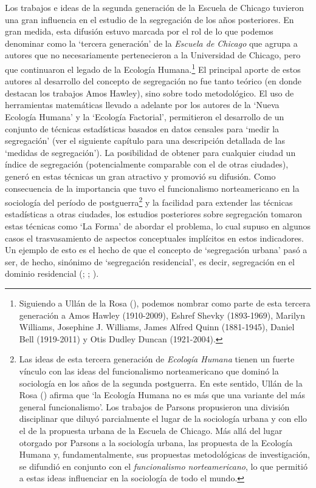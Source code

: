 \documentclass[
  spanish,
  a4paper,%
  chapterprefix=true,%
  DIV=calc,%
  twoside]{scrbook}%
\begin{document}
Los trabajos e ideas de la segunda generación de la Escuela de Chicago
tuvieron una gran influencia en el estudio de la segregación de los años
posteriores.
En
gran medida, esta difusión estuvo marcada por el rol de lo que podemos
denominar como la `tercera generación' de la \emph{Escuela de Chicago} que
agrupa a autores que no necesariamente pertenecieron a la Universidad de
Chicago, pero que continuaron el legado de la Ecología
Humana.\footnote{Siguiendo a Ullán de la Rosa (), podemos nombrar
  como parte de esta tercera generación a Amos Hawley (1910-2009),
  Eshref Shevky (1893-1969), Marilyn Williams, Josephine J. Williams,
  James Alfred Quinn (1881-1945), Daniel Bell (1919-2011) y Otis
  Dudley Duncan (1921-2004).} El principal aporte de estos autores al
desarrollo del concepto de segregación no fue tanto teórico (en donde
destacan los trabajos Amos Hawley), sino sobre todo metodológico. El uso
de herramientas matemáticas llevado a adelante por los autores de la
`Nueva Ecología Humana' y la `Ecología Factorial', permitieron el
desarrollo de un conjunto de técnicas estadísticas basados en datos
censales para `medir la segregación' (ver el siguiente capítulo para una
descripción detallada de las `medidas de segregación'). La posibilidad
de obtener para cualquier ciudad un índice de segregación
(potencialmente comparable con el de otras ciudades), generó en estas
técnicas un gran atractivo y promovió su difusión. Como consecuencia de
la importancia que tuvo el funcionalismo norteamericano en la sociología
del período de postguerra\footnote{Las ideas de esta tercera generación de \emph{Ecología
  Humana} tienen un fuerte vínculo con las ideas del funcionalismo
  norteamericano que dominó la sociología en los años de la segunda
  postguerra. En este sentido, Ullán de la Rosa () afirma que
  `la Ecología Humana no es más que una variante del más general
  funcionalismo'. Los trabajos de Parsons propusieron una división
  disciplinar que diluyó parcialmente el lugar de la sociología urbana
  y con ello el de la propuesta urbana de la Escuela de Chicago. Más
  allá del lugar otorgado por Parsons a la sociología urbana, las
  propuesta de la Ecología Humana y, fundamentalmente, sus propuestas
  metodológicas de investigación, se difundió en conjunto con el
  \emph{funcionalismo norteamericano}, lo que permitió a estas ideas
  influenciar en la sociología de todo el mundo.} y la facilidad para
extender las técnicas estadísticas a otras ciudades, los estudios
posteriores sobre segregación tomaron estas técnicas como `La Forma' de
abordar el problema, lo cual supuso en algunos casos el trasvasamiento
de aspectos conceptuales implícitos en estos indicadores. Un ejemplo de
esto es el hecho de que el concepto de `segregación urbana' pasó a ser,
de hecho, sinónimo de `segregación residencial', es decir, segregación
en el dominio residencial (; ; ).
\end{document}
